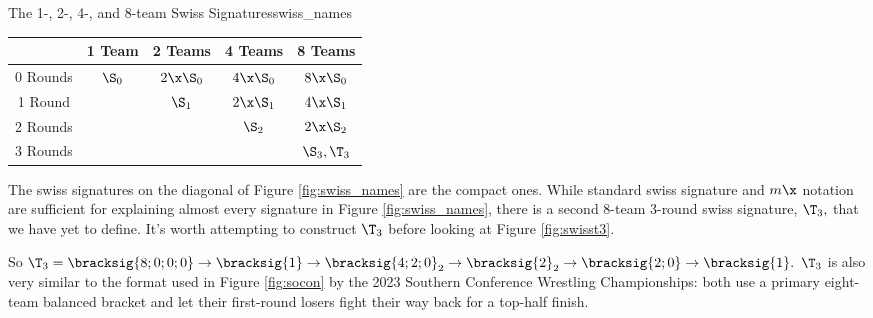 {    \begin{figg}{The 1-, 2-, 4-, and 8-team Swiss Signatures}{swiss_names}
        \begin{center}
            \begin{tabular}{ c | c | c | c | c}
                & 1 Team & 2 Teams & 4 Teams & 8 Teams\\
                \hline
                0 Rounds & $\S_0$ & $2\x\S_0$ & $4\x\S_0$ & $8\x\S_0$\\
                \hline
                1 Round & & $\S_1$ & $2\x\S_1$ & $4\x\S_1$\\
                \hline
                2 Rounds & & & $\S_2$ & $2\x\S_2$\\
                \hline
                \multirow{1}{*}{3 Rounds} & & & &  $\S_3, \T_3$ \\
            \end{tabular}
        \end{center}
        \end{figg}

    The swiss signatures on the diagonal of Figure \ref{fig:swiss_names} are the compact ones. While standard swiss signature and $m\x$ notation are sufficient for explaining almost every signature in Figure \ref{fig:swiss_names}, there is a second 8-team 3-round swiss signature, $\T_3,$ that we have yet to define. It's worth attempting to construct $\T_3$ before looking at Figure \ref{fig:swisst3}.


    So $\T_3 = \bracksig{8;0;0;0} \to \bracksig{1} \to \bracksig{4;2;0}_2 \to \bracksig{2}_2 \to \bracksig{2;0} \to \bracksig{1}.$ $\T_3$ is also very similar to the format used in Figure \ref{fig:socon} by the 2023 Southern Conference Wrestling Championships: both use a primary eight-team balanced bracket and let their first-round losers fight their way back for a top-half finish.

    }
